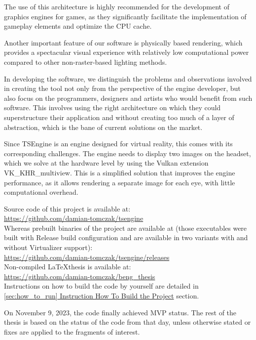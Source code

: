 The use of this architecture is highly recommended for the development of graphics engines for games, as they significantly facilitate the implementation of gameplay elements and optimize the CPU cache.

Another important feature of our software is physically based rendering, which provides a spectacular visual experience with relatively low computational power compared to other non-raster-based lighting methods.

In developing the software, we distinguish the problems and observations involved in creating the tool not only from the perspective of the engine developer, but also focus on the programmers, designers and artists who would benefit from such software. This involves using the right architecture on which they could superstructure their application and without creating too much of a layer of abstraction, which is the bane of current solutions on the market.

Since TSEngine is an engine designed for virtual reality, this comes with its corresponding challenges. The engine needs to display two images on the headset, which we solve at the hardware level by using the Vulkan extension VK\_KHR\_multiview. This is a simplified solution that improves the engine performance, as it allows rendering a separate image for each eye, with little computational overhead.

Source code of this project is available at:\\
\href{https://github.com/damian-tomczak/tsengine}{https://github.com/damian-tomczak/tsengine}\\
Whereas prebuilt binaries of the project are available at (those executables were built with Release build configuration and are available in two variants with and without Virtualizer support):\\
\href{https://github.com/damian-tomczak/tsengine/releases}{https://github.com/damian-tomczak/tsengine/releases}\\
Non-compiled \LaTeX thesis is available at:\\
\href{https://github.com/damian-tomczak/beng_thesis}{https://github.com/damian-tomczak/beng\_thesis}\\
Instructions on how to build the code by yourself are detailed in \hyperref[sec:how_to_run]{\ref*{sec:how_to_run} Instruction How To Build the Project} section.

On November 9, 2023, the code finally achieved MVP status. The rest of the thesis is based on the status of the code from that day, unless otherwise stated or fixes are applied to the fragments of interest.

